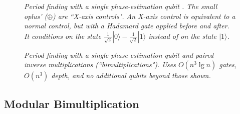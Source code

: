 \documentclass[twocolumn]{article}
\begin{document}
\begin{figure}
  \centering
  \caption{\em
	Period finding with a single phase-estimation qubit \cite{beauregard2003}.
	The small oplus' ({\tiny $\oplus$}) are ``X-axis controls".
	An X-axis control is equivalent to a normal control, but with a Hadamard gate applied before and after.
	It conditions on the state $\frac{1}{\sqrt 2}|0\rangle - \frac{1}{\sqrt 2}|1\rangle$ instead of on the state $|1\rangle$.
  }
  \label{fig:period-finding-solo-phase-qubit}
\end{figure}

\begin{figure}
  \centering
  \caption{\em
	Period finding with a single phase-estimation qubit and paired inverse multiplications (``bimultiplications").
	Uses $O(n^3 \lg n)$ gates, $O(n^3)$ depth, and no additional qubits beyond those shown.
  }
  \label{fig:period-finding-solo-phase-qubit-explicit-dirty-register}
\end{figure}


\subsection{Modular Bimultiplication}
\end{document}
